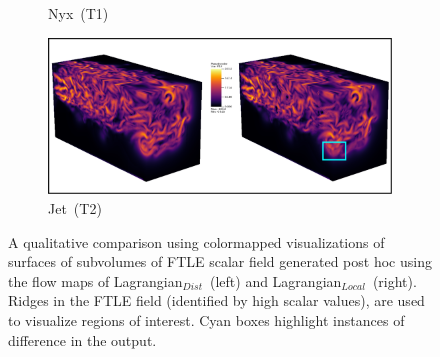 \begin{figure}[!h]
\begin{subfigure}{\linewidth}
\vspace{-5mm}
\caption{Nyx~(T1)}
\label{nyx_ftle}
\end{subfigure}
\begin{subfigure}{\linewidth}
\centering
\includegraphics[width=1\linewidth,keepaspectratio]{Images/jet_ftle.pdf}
\vspace{-5mm}
\caption{Jet~(T2)}
\label{jet_ftle}
\end{subfigure}
\caption{A qualitative comparison using colormapped visualizations of surfaces of subvolumes of FTLE scalar field generated post hoc using the flow maps of Lagrangian$_{Dist}$~(left) and Lagrangian$_{Local}$~(right). Ridges in the FTLE field (identified by high scalar values), are used to visualize regions of interest. Cyan boxes highlight instances of difference in the output.}
\label{fig:ftle_visualizations}
\vspace{-6mm}
\end{figure}
